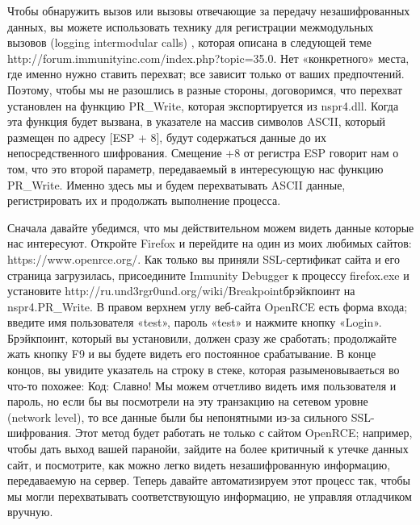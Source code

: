 \documentclass[12pt, a4paper, oneside]{book}
\begin{document}
Чтобы обнаружить вызов или вызовы отвечающие за передачу незашифрованных данных, вы можете использовать технику для регистрации межмодульных вызовов (logging intermodular calls) , которая описана в следующей теме http://forum.immunityinc.com/index.php?topic=35.0. Нет «конкретного» места, где именно нужно ставить перехват; все зависит только от ваших предпочтений. Поэтому, чтобы мы не разошлись в разные стороны, договоримся, что перехват установлен на функцию PR\_Write, которая экспортируется из nspr4.dll. Когда эта функция будет вызвана, в указателе на массив символов ASCII, который размещен по адресу [ESP + 8], будут содержаться данные до их непосредственного шифрования. Смещение +8 от регистра ESP говорит нам о том, что это второй параметр, передаваемый в интересующую нас функцию PR\_Write. Именно здесь мы и будем перехватывать ASCII данные, регистрировать их и продолжать выполнение процесса. 

Сначала давайте убедимся, что мы действительном можем видеть данные которые нас интересуют. Откройте Firefox и перейдите на один из моих любимых сайтов: https://www.openrce.org/. Как только вы приняли SSL-сертификат сайта и его страница загрузилась, присоедините Immunity Debugger к процессу firefox.exe и установите http://ru.und3rgr0und.org/wiki/Breakpointбрэйкпоинт на nspr4.PR\_Write. В правом верхнем углу веб-сайта OpenRCE есть форма входа; введите имя пользователя «test», пароль «test» и нажмите кнопку «Login». Брэйкпоинт, который вы установили, должен сразу же сработать; продолжайте жать кнопку F9 и вы будете видеть его постоянное срабатывание. В конце концов, вы увидите указатель на строку в стеке, которая разыменовываеться во что-то похожее:
Код:
Славно! Мы можем отчетливо видеть имя пользователя и пароль, но если бы вы посмотрели на эту транзакцию на сетевом уровне (network level), то все данные были бы непонятными из-за сильного SSL-шифрования. Этот метод будет работать не только с сайтом OpenRCE; например, чтобы дать выход вашей паранойи, зайдите на более критичный к утечке данных сайт, и посмотрите, как можно легко видеть незашифрованную информацию, передаваемую на сервер. Теперь давайте автоматизируем этот процесс так, чтобы мы могли перехватывать соответствующую информацию, не управляя отладчиком вручную. 
\end{document}

